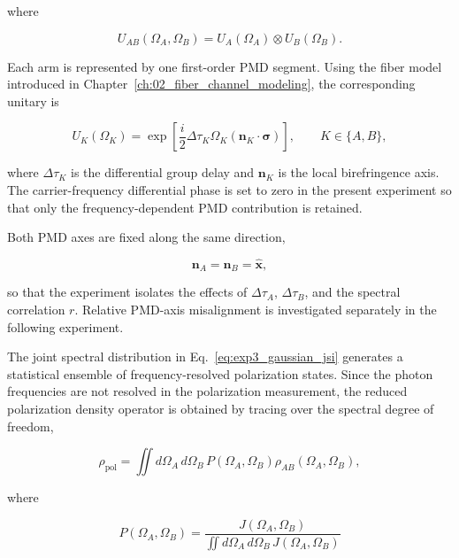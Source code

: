 where

\begin{equation}
U_{AB}(\Omega_A,\Omega_B)
=
U_A(\Omega_A)
\otimes
U_B(\Omega_B).
\label{eq:exp3_two_arm_unitary}
\end{equation}

Each arm is represented by one first-order PMD segment. Using the fiber model
introduced in Chapter~\ref{ch:02_fiber_channel_modeling}, the corresponding
unitary is

\begin{equation}
U_K(\Omega_K)
=
\exp
\left[
\frac{i}{2}
\Delta\tau_K
\Omega_K
\left(
\mathbf{n}_K\cdot\boldsymbol{\sigma}
\right)
\right],
\qquad
K\in\{A,B\},
\label{eq:exp3_single_arm_pmd_unitary}
\end{equation}

where \(\Delta\tau_K\) is the differential group delay and
\(\mathbf{n}_K\) is the local birefringence axis. The carrier-frequency
differential phase is set to zero in the present experiment so that only the
frequency-dependent PMD contribution is retained.

Both PMD axes are fixed along the same direction,

\begin{equation}
\mathbf{n}_A
=
\mathbf{n}_B
=
\hat{\mathbf{x}},
\label{eq:exp3_aligned_pmd_axes}
\end{equation}

so that the experiment isolates the effects of
\(\Delta\tau_A\), \(\Delta\tau_B\), and the spectral correlation \(r\).
Relative PMD-axis misalignment is investigated separately in the following
experiment.

The joint spectral distribution in
Eq.~\eqref{eq:exp3_gaussian_jsi} generates a statistical ensemble of
frequency-resolved polarization states. Since the photon frequencies are not
resolved in the polarization measurement, the reduced polarization density
operator is obtained by tracing over the spectral degree of freedom,

\begin{equation}
\boxed{
\rho_{\mathrm{pol}}
=
\iint
d\Omega_A\,d\Omega_B\,
P(\Omega_A,\Omega_B)
\rho_{AB}(\Omega_A,\Omega_B),
}
\label{eq:exp3_spectral_average}
\end{equation}

where

\begin{equation}
P(\Omega_A,\Omega_B)
=
\frac{
J(\Omega_A,\Omega_B)
}{
\displaystyle
\iint
d\Omega_A\,d\Omega_B\,
J(\Omega_A,\Omega_B)
}
\label{eq:exp3_normalized_jsi}
\end{equation}

